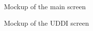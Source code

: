 \documentclass[titlepage]{article}
\begin{document}
\begin{figure}
    \centering
    \caption{Mockup of the main screen}
    \label{fig-gui-main}
\end{figure}

\begin{figure}
    \centering
    \caption{Mockup of the UDDI screen}
    \label{fig-gui-uddi}
\end{figure}


% 
% 
% 
\end{document}
